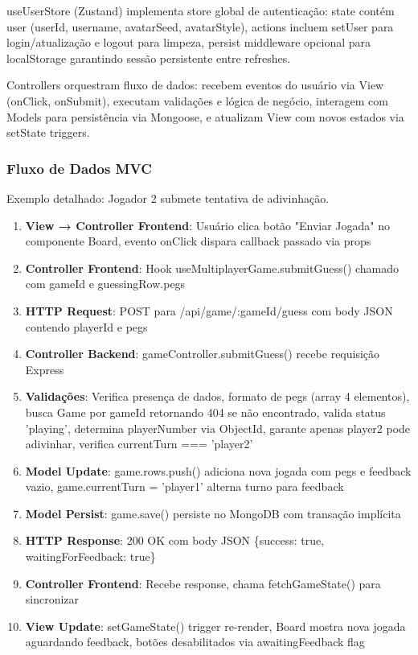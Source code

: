 \documentclass[conference]{IEEEtran}
\begin{document}
useUserStore (Zustand) implementa store global de autenticação: state contém user (userId, username, avatarSeed, avatarStyle), actions incluem setUser para login/atualização e logout para limpeza, persist middleware opcional para localStorage garantindo sessão persistente entre refreshes.

Controllers orquestram fluxo de dados: recebem eventos do usuário via View (onClick, onSubmit), executam validações e lógica de negócio, interagem com Models para persistência via Mongoose, e atualizam View com novos estados via setState triggers.

\subsubsection{Fluxo de Dados MVC}

Exemplo detalhado: Jogador 2 submete tentativa de adivinhação.

\begin{enumerate}
\item \textbf{View → Controller Frontend}: Usuário clica botão "Enviar Jogada" no componente Board, evento onClick dispara callback passado via props
\item \textbf{Controller Frontend}: Hook useMultiplayerGame.submitGuess() chamado com gameId e guessingRow.pegs
\item \textbf{HTTP Request}: POST para /api/game/:gameId/guess com body JSON contendo playerId e pegs
\item \textbf{Controller Backend}: gameController.submitGuess() recebe requisição Express
\item \textbf{Validações}: Verifica presença de dados, formato de pegs (array 4 elementos), busca Game por gameId retornando 404 se não encontrado, valida status 'playing', determina playerNumber via ObjectId, garante apenas player2 pode adivinhar, verifica currentTurn === 'player2'
\item \textbf{Model Update}: game.rows.push() adiciona nova jogada com pegs e feedback vazio, game.currentTurn = 'player1' alterna turno para feedback
\item \textbf{Model Persist}: game.save() persiste no MongoDB com transação implícita
\item \textbf{HTTP Response}: 200 OK com body JSON \{success: true, waitingForFeedback: true\}
\item \textbf{Controller Frontend}: Recebe response, chama fetchGameState() para sincronizar
\item \textbf{View Update}: setGameState() trigger re-render, Board mostra nova jogada aguardando feedback, botões desabilitados via awaitingFeedback flag
\end{enumerate}
\end{document}
